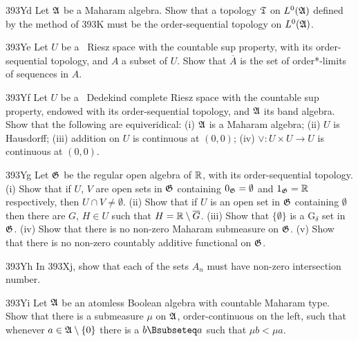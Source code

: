 {\spheader 393Yd Let $\frak A$
be a Maharam algebra.   Show that a topology $\frak T$ on $L^0(\frak A)$
defined by the method of 393K must be the order-sequential topology on
$L^0(\frak A)$.

\spheader 393Ye Let $U$ be a \wsid\ Riesz space with the countable sup
property, with its
order-sequential topology, and $A$ a subset of $U$.
Show that $\overline{A}$ is the set of
order*-limits of sequences in $A$.

\spheader 393Yf Let $U$ be a \wsid\ Dedekind complete Riesz space with the
countable sup property, endowed with its order-sequential topology,
and $\frak A$ its band algebra.   Show that the following are
equiveridical:   (i) $\frak A$ is a Maharam algebra;
(ii) $U$ is Hausdorff;
(iii) addition on $U$ is continuous at $(0,0)$;
(iv) $\vee:U\times U\to U$ is continuous at $(0,0)$.

\spheader 393Yg Let $\frak G$ be the regular open algebra of
$\Bbb R$, with its order-sequential topology.   (i) Show that if $U$, $V$
are open sets in $\frak G$ containing $0_{\frak G}=\emptyset$ and
$1_{\frak G}=\Bbb R$ respectively, then $U\cap V\ne\emptyset$.
(ii) Show that if $U$ is an open set in $\frak G$ containing
$\emptyset$ then there are $G$, $H\in U$ such that
$H=\Bbb R\setminus\overline{G}$.
(iii) Show that $\{\emptyset\}$ is a G$_{\delta}$ set in $\frak G$.
(iv) Show that there is no non-zero Maharam submeasure on $\frak G$.
(v) Show that there is no non-zero countably additive functional on
$\frak G$.

\spheader 393Yh In 393Xj, show that each of the sets $A_n$ must have
non-zero intersection number.

\spheader 393Yi Let $\frak A$ be an atomless Boolean algebra with countable
Maharam type.   Show that there is a submeasure $\mu$ on
$\frak A$, order-continuous on the left, such that whenever
$a\in\frak A\setminus\{0\}$ there is a $b\Bsubseteq a$ such that
$\mu b<\mu a$.
}%

